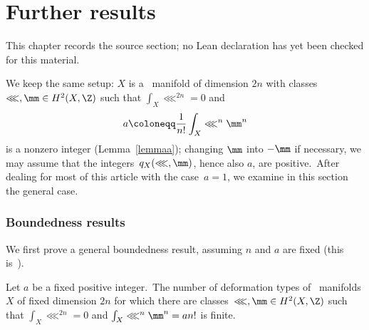 \chapter{Further results}
\label{riemann-roch-polynomials-hyperkahler-fourfolds-chapter-09}

\begin{remark}
\label{riemann-roch-polynomials-hyperkahler-fourfolds-chapter-09-source}
This chapter records the source section; no Lean declaration has yet been checked for this material.
\notready
\end{remark}

\label{sec:further}
We keep the same setup: $X$ is a \hk\ manifold of dimension $2n$ with classes $\lll,\mm\in H^2(X,\Z)$ such that $\int_X\lll^{2n}=0$ and
$$a\coloneqq \frac 1{n!} \int_X\lll^n\mm^n$$
is a nonzero integer (Lemma~\ref{lemmaa});  changing $\mm$ into $-\mm$ if necessary, we may assume that the integers~$q_X(\lll,\mm)$, hence also $a$, are positive.\ After dealing for most of   this article  with the case~$a=1$, we examine in this section the general case.

\subsection{Boundedness results}

We first prove a general boundedness result, assuming $n$ and $a$ are fixed (this is~\cite[Theorem~4.9]{kam}).

\begin{prop}
\notready\label{prop41}
Let $a$ be a fixed positive integer.\
The number of deformation types of \hk\ manifolds $X$ of fixed dimension $2n$ for which there are classes~$\lll,\mm\in H^2(X,\Z)$ such that $\int_X \lll^{2n}=0$ and $\int_X \lll^{n}\mm^{n}=an!$ is finite.
\end{prop}

